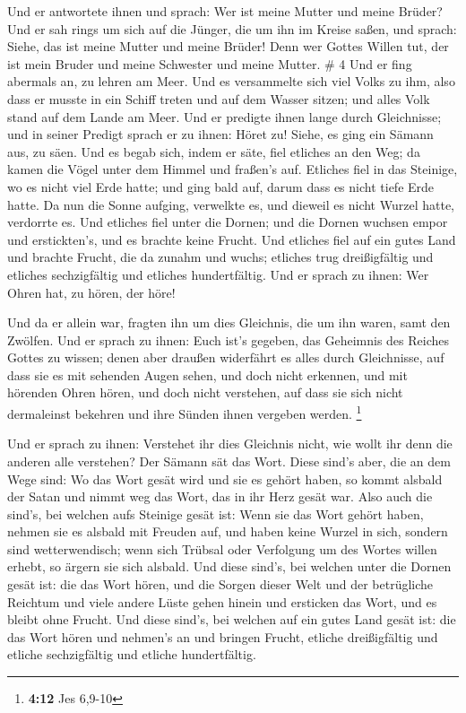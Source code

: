 Und er antwortete ihnen und sprach: Wer ist meine Mutter
und meine Brüder?  Und er sah rings um sich auf die
Jünger, die um ihn im Kreise saßen, und sprach: Siehe, das ist meine
Mutter und meine Brüder!  Denn wer Gottes Willen tut, der
ist mein Bruder und meine Schwester und meine Mutter. \# 4
 Und er fing abermals an, zu lehren am Meer. Und es
versammelte sich viel Volks zu ihm, also dass er musste in ein Schiff
treten und auf dem Wasser sitzen; und alles Volk stand auf dem Lande am
Meer.  Und er predigte ihnen lange durch Gleichnisse; und
in seiner Predigt sprach er zu ihnen:  Höret zu! Siehe, es
ging ein Sämann aus, zu säen.  Und es begab sich, indem er
säte, fiel etliches an den Weg; da kamen die Vögel unter dem Himmel und
fraßen's auf.  Etliches fiel in das Steinige, wo es nicht
viel Erde hatte; und ging bald auf, darum dass es nicht tiefe Erde
hatte.  Da nun die Sonne aufging, verwelkte es, und
dieweil es nicht Wurzel hatte, verdorrte es.  Und etliches
fiel unter die Dornen; und die Dornen wuchsen empor und erstickten's,
und es brachte keine Frucht.  Und etliches fiel auf ein
gutes Land und brachte Frucht, die da zunahm und wuchs; etliches trug
dreißigfältig und etliches sechzigfältig und etliches hundertfältig.
 Und er sprach zu ihnen: Wer Ohren hat, zu hören, der
höre!

 Und da er allein war, fragten ihn um dies Gleichnis, die
um ihn waren, samt den Zwölfen.  Und er sprach zu ihnen:
Euch ist's gegeben, das Geheimnis des Reiches Gottes zu wissen; denen
aber draußen widerfährt es alles durch Gleichnisse,  auf
dass sie es mit sehenden Augen sehen, und doch nicht erkennen, und mit
hörenden Ohren hören, und doch nicht verstehen, auf dass sie sich nicht
dermaleinst bekehren und ihre Sünden ihnen vergeben werden. \footnote{\textbf{4:12}
  Jes 6,9-10}

 Und er sprach zu ihnen: Verstehet ihr dies Gleichnis
nicht, wie wollt ihr denn die anderen alle verstehen? 
Der Sämann sät das Wort.  Diese sind's aber, die an dem
Wege sind: Wo das Wort gesät wird und sie es gehört haben, so kommt
alsbald der Satan und nimmt weg das Wort, das in ihr Herz gesät war.
 Also auch die sind's, bei welchen aufs Steinige gesät
ist: Wenn sie das Wort gehört haben, nehmen sie es alsbald mit Freuden
auf,  und haben keine Wurzel in sich, sondern sind
wetterwendisch; wenn sich Trübsal oder Verfolgung um des Wortes willen
erhebt, so ärgern sie sich alsbald.  Und diese sind's,
bei welchen unter die Dornen gesät ist: die das Wort hören,
 und die Sorgen dieser Welt und der betrügliche Reichtum
und viele andere Lüste gehen hinein und ersticken das Wort, und es
bleibt ohne Frucht.  Und diese sind's, bei welchen auf
ein gutes Land gesät ist: die das Wort hören und nehmen's an und bringen
Frucht, etliche dreißigfältig und etliche sechzigfältig und etliche
hundertfältig.

